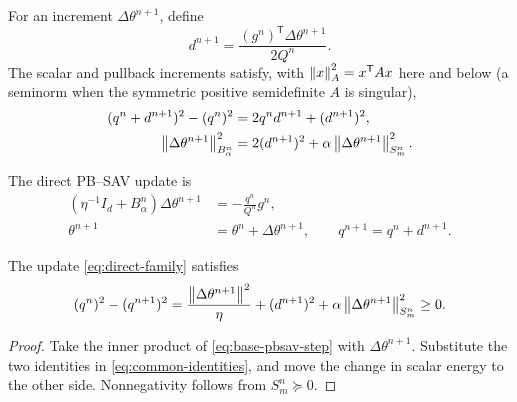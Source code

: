 For an increment \(\Delta\theta^{n+1}\), define
\begin{equation}
  d^{n+1}
  =\frac{(g^n)^{\mathsf T}\Delta\theta^{n+1}}{2Q^n}.
  \label{eq:common-d}
\end{equation}
The scalar and pullback increments satisfy, with
\(\left\lVert x\right\rVert_A^2=x^{\mathsf T}Ax\) here and below (a seminorm when the
symmetric positive semidefinite \(A\) is singular),
\begin{subequations}
\label{eq:common-identities}
\begin{align}
  (q^n+d^{n+1})^2-(q^n)^2
  &=2q^nd^{n+1}+(d^{n+1})^2,
  \label{eq:common-scalar-identity}\\
  \left\lVert\Delta\theta^{n+1}\right\rVert_{B_\alpha^n}^2
  &=2(d^{n+1})^2
  +\alpha\left\lVert\Delta\theta^{n+1}\right\rVert_{S_m^n}^2.
  \label{eq:common-pullback-identity}
\end{align}
\end{subequations}

The direct PB--SAV update \cite{zhang2026pbsav} is
\begin{subequations}
\label{eq:direct-family}
\begin{align}
  \left(\eta^{-1}I_d+B_\alpha^n\right)\Delta\theta^{n+1}
  &=-\frac{q^n}{Q^n}g^n,
  \label{eq:base-pbsav-step}\\
  \theta^{n+1}&=\theta^n+\Delta\theta^{n+1},
  \qquad
  q^{n+1}=q^n+d^{n+1}.
  \label{eq:base-pbsav-state}
\end{align}
\end{subequations}

\begin{theorem}
\label{thm:base-dissipation}
The update \cref{eq:direct-family} satisfies
\begin{equation}
  (q^n)^2-(q^{n+1})^2
  =\frac{\left\lVert\Delta\theta^{n+1}\right\rVert^2}{\eta}
  +(d^{n+1})^2
  +\alpha\left\lVert\Delta\theta^{n+1}\right\rVert_{S_m^n}^2
  \geq0.
\label{eq:base-dissipation}
\end{equation}
\end{theorem}

\begin{proof}
Take the inner product of \cref{eq:base-pbsav-step} with
\(\Delta\theta^{n+1}\).  Substitute the two identities in
\cref{eq:common-identities}, and move the change in scalar energy to the other
side. Nonnegativity follows from \(S_m^n\succeq0\).
\end{proof}
